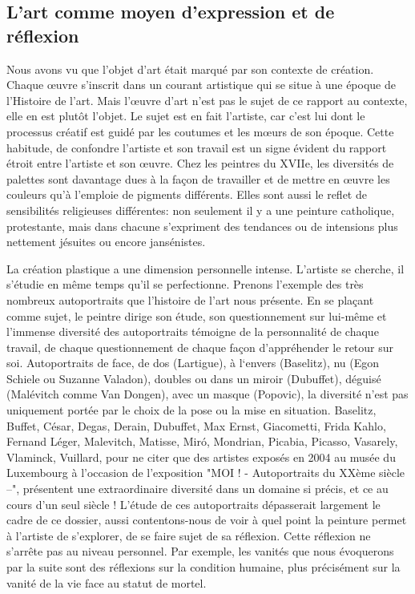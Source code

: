 \subsection{L'art comme moyen d'expression et de réflexion}
\xspace

	Nous avons vu que l'objet d'art était marqué par son contexte de création. Chaque \oe{}uvre s'inscrit dans un courant artistique qui se situe à une époque de l'Histoire de l'art. Mais l'\oe{}uvre d'art n'est pas le sujet de ce rapport au contexte, elle en est plutôt l'objet. Le sujet est en fait l'artiste, car c'est lui dont le processus créatif est guidé par les coutumes et les m\oe{}urs de son époque. Cette habitude, de confondre l'artiste et son travail est un signe évident du rapport étroit entre l'artiste et son \oe{}uvre. Chez les peintres du XVIIe, les diversités de palettes sont davantage dues à la façon de travailler et de mettre en \oe{}uvre les couleurs qu'à l'emploie de pigments différents. Elles sont aussi le reflet de sensibilités religieuses différentes: non seulement il y a une peinture catholique, protestante, mais dans chacune s'expriment des tendances ou de intensions plus nettement jésuites ou encore jansénistes.


	La création plastique a une dimension personnelle intense. L'artiste se cherche, il s'étudie en même temps qu'il se perfectionne. Prenons l'exemple des très nombreux autoportraits que l'histoire de l'art nous présente. En se plaçant comme sujet, le peintre dirige son étude, son questionnement sur lui-même et l'immense diversité des autoportraits témoigne de la personnalité de chaque travail, de chaque questionnement de chaque façon d'appréhender le retour sur soi. Autoportraits de face, de dos (Lartigue), à l‘envers (Baselitz), nu (Egon Schiele ou Suzanne Valadon), doubles ou dans un miroir (Dubuffet), déguisé (Malévitch comme Van Dongen), avec un masque (Popovic), la diversité n'est pas uniquement portée par le choix de la pose ou la mise en situation. Baselitz, Buffet, César, Degas, Derain, Dubuffet, Max Ernst, Giacometti, Frida Kahlo, Fernand Léger, Malevitch, Matisse, Miró, Mondrian, Picabia, Picasso, Vasarely, Vlaminck, Vuillard, pour ne citer que des artistes exposés en 2004 au musée du Luxembourg à l'occasion de l'exposition "MOI ! - Autoportraits du XXème siècle –", présentent une extraordinaire diversité dans un domaine si précis, et ce au cours d'un seul siècle ! L'étude de ces autoportraits dépasserait largement le cadre de ce dossier, aussi contentons-nous de voir à quel point la peinture permet à l'artiste de s'explorer, de se faire sujet de sa réflexion. Cette réflexion ne s'arrête pas au niveau personnel. Par exemple, les vanités que nous évoquerons par la suite sont des réflexions sur la condition humaine, plus précisément sur la vanité de la vie face au statut de mortel.


